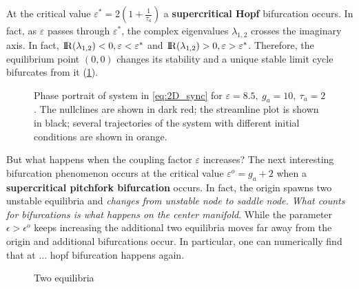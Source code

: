 At the critical value $\varepsilon^* = 2 ( 1 + \frac{1}{\tau_a} ) $ a \textbf{supercritical Hopf} bifurcation occurs. In fact, as $\varepsilon$ passes through $\varepsilon^*$, the complex eigenvalues $\lambda_{1,2}$ crosses the imaginary axis. In fact, ${\rm I\!R}(\lambda_{1,2})<0, \varepsilon < \varepsilon^*$ and  ${\rm I\!R}(\lambda_{1,2})>0, \varepsilon > \varepsilon^*$. Therefore, the equilibrium point $(0, 0)$ changes its stability and a unique stable limit cycle bifurcates from it (\cref{fig:eq2D_cycle}).
\begin{figure}[!h]
        \caption{\label{fig:eq2D_cycle} Phase portrait of system in \eqref{eq:2D_sync} for $\varepsilon=8.5,\ g_a=10,\ \tau_a=2$. The nullclines are shown in dark red; the streamline plot is shown in black; several trajectories of the system with different initial conditions are shown in orange.}
\end{figure}


But what happens when the coupling factor $\varepsilon$ increases? The next interesting bifurcation phenomenon occurs at the critical value $\varepsilon^o = g_a + 2$ when a \textbf{supercritical pitchfork bifurcation} occurs. In fact, the origin spawns two unstable equilibria and \textit{changes from unstable node to saddle node. What counts for bifurcations is what happens on the center manifold}. While the parameter $\epsilon > \epsilon^o$ keeps increasing the additional two equilibria moves far away from the origin and additional bifurcations occur. In particular, one can numerically find that at ... hopf bifurcation happens again.


\begin{figure}[!h]
        \caption{\label{fig:eq2D_mem}Two equilibria}
\end{figure}